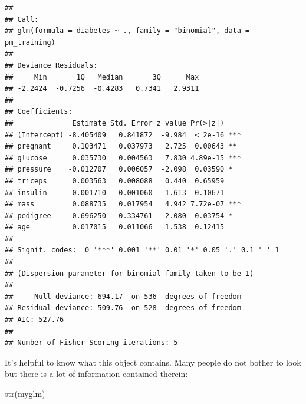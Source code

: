 \documentclass[
]{article}
\newenvironment{Shaded}{\begin{snugshade}}{\end{snugshade}}
\newcommand{\FunctionTok}[1]{\textcolor[rgb]{0.00,0.00,0.00}{#1}}
\newcommand{\NormalTok}[1]{#1}
\begin{document}
\begin{verbatim}
## 
## Call:
## glm(formula = diabetes ~ ., family = "binomial", data = pm_training)
## 
## Deviance Residuals: 
##     Min       1Q   Median       3Q      Max  
## -2.2424  -0.7256  -0.4283   0.7341   2.9311  
## 
## Coefficients:
##              Estimate Std. Error z value Pr(>|z|)    
## (Intercept) -8.405409   0.841872  -9.984  < 2e-16 ***
## pregnant     0.103471   0.037973   2.725  0.00643 ** 
## glucose      0.035730   0.004563   7.830 4.89e-15 ***
## pressure    -0.012707   0.006057  -2.098  0.03590 *  
## triceps      0.003563   0.008088   0.440  0.65959    
## insulin     -0.001710   0.001060  -1.613  0.10671    
## mass         0.088735   0.017954   4.942 7.72e-07 ***
## pedigree     0.696250   0.334761   2.080  0.03754 *  
## age          0.017015   0.011066   1.538  0.12415    
## ---
## Signif. codes:  0 '***' 0.001 '**' 0.01 '*' 0.05 '.' 0.1 ' ' 1
## 
## (Dispersion parameter for binomial family taken to be 1)
## 
##     Null deviance: 694.17  on 536  degrees of freedom
## Residual deviance: 509.76  on 528  degrees of freedom
## AIC: 527.76
## 
## Number of Fisher Scoring iterations: 5
\end{verbatim}

It's helpful to know what this object contains. Many people do not
bother to look but there is a lot of information contained therein:

\begin{Shaded}
\begin{Highlighting}[]
\FunctionTok{str}\NormalTok{(myglm)}
\end{Highlighting}
\end{Shaded}
\end{document}
